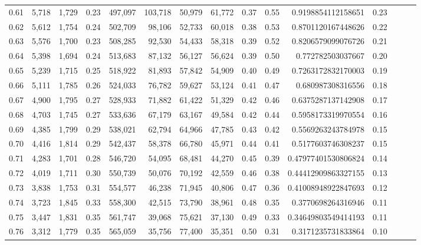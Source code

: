 \begin{tabular}{rrrrrrrrrrrrrrr}
0.61 &  5,718 &  1,729 &  0.23 &  497,097 &  103,718 &   50,979 &   61,772 &  0.37 &  0.55 &      0.9198854112158651 &      0.23 \\
0.62 &  5,612 &  1,754 &  0.24 &  502,709 &   98,106 &   52,733 &   60,018 &  0.38 &  0.53 &      0.8701120167448626 &      0.22 \\
0.63 &  5,576 &  1,700 &  0.23 &  508,285 &   92,530 &   54,433 &   58,318 &  0.39 &  0.52 &      0.8206579099076726 &      0.21 \\
0.64 &  5,398 &  1,694 &  0.24 &  513,683 &   87,132 &   56,127 &   56,624 &  0.39 &  0.50 &       0.772782503037667 &      0.20 \\
0.65 &  5,239 &  1,715 &  0.25 &  518,922 &   81,893 &   57,842 &   54,909 &  0.40 &  0.49 &      0.7263172832170003 &      0.19 \\
0.66 &  5,111 &  1,785 &  0.26 &  524,033 &   76,782 &   59,627 &   53,124 &  0.41 &  0.47 &       0.680987308316556 &      0.18 \\
0.67 &  4,900 &  1,795 &  0.27 &  528,933 &   71,882 &   61,422 &   51,329 &  0.42 &  0.46 &      0.6375287137142908 &      0.17 \\
0.68 &  4,703 &  1,745 &  0.27 &  533,636 &   67,179 &   63,167 &   49,584 &  0.42 &  0.44 &      0.5958173319970554 &      0.16 \\
0.69 &  4,385 &  1,799 &  0.29 &  538,021 &   62,794 &   64,966 &   47,785 &  0.43 &  0.42 &      0.5569263243784978 &      0.15 \\
0.70 &  4,416 &  1,814 &  0.29 &  542,437 &   58,378 &   66,780 &   45,971 &  0.44 &  0.41 &      0.5177603746308237 &      0.15 \\
0.71 &  4,283 &  1,701 &  0.28 &  546,720 &   54,095 &   68,481 &   44,270 &  0.45 &  0.39 &     0.47977401530806824 &      0.14 \\
0.72 &  4,019 &  1,711 &  0.30 &  550,739 &   50,076 &   70,192 &   42,559 &  0.46 &  0.38 &     0.44412909863327155 &      0.13 \\
0.73 &  3,838 &  1,753 &  0.31 &  554,577 &   46,238 &   71,945 &   40,806 &  0.47 &  0.36 &     0.41008948922847693 &      0.12 \\
0.74 &  3,723 &  1,845 &  0.33 &  558,300 &   42,515 &   73,790 &   38,961 &  0.48 &  0.35 &      0.3770698264316946 &      0.11 \\
0.75 &  3,447 &  1,831 &  0.35 &  561,747 &   39,068 &   75,621 &   37,130 &  0.49 &  0.33 &     0.34649803549414193 &      0.11 \\
0.76 &  3,312 &  1,779 &  0.35 &  565,059 &   35,756 &   77,400 &   35,351 &  0.50 &  0.31 &      0.3171235731833864 &      0.10 \\

\end{tabular}
